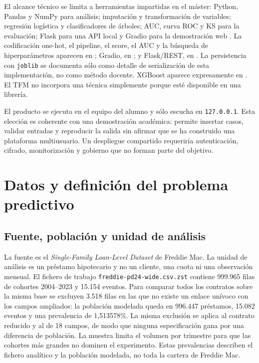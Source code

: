 \documentclass[10pt,a4paper]{article}
\newcommand{\DataFile}{\texttt{freddie-pd24-wide.csv.zst}}
\newcommand{\SourceLoans}{999.965}
\newcommand{\SourceEvents}{15.154}
\newcommand{\ModelLoans}{996.447}
\newcommand{\ModelEvents}{15.082}
\newcommand{\ModelEventRate}{1,513578\%}
\begin{document}
El alcance técnico se limita a herramientas impartidas en el máster: Python,
Pandas y NumPy para análisis; imputación y transformación de variables;
regresión logística y clasificadores de árboles; AUC, curva ROC y KS para la
evaluación; Flask para una API local y Gradio para la demostración web
\cite{data-prep,seleccion,logistica,clasificadores,scoring}. La codificación
one-hot, el pipeline, el score, el AUC y la búsqueda de hiperparámetros aparecen
en \cite[pp.~71, 73--74 y 76--81]{spark}; Gradio, en
\cite[p.~17]{ml-semanas}; y Flask/REST, en
\cite[pp.~98, 103--108 y 114]{productivizacion}. La persistencia con
\texttt{joblib} se documenta sólo como detalle de serialización de esta
implementación, no como método docente. XGBoost aparece expresamente en
\cite[p.~24]{ml-semanas}. El TFM no incorpora una técnica simplemente porque
esté disponible en una librería.

El producto se ejecuta en el equipo del alumno y sólo escucha en
\texttt{127.0.0.1}. Esta elección es coherente con una demostración académica:
permite insertar casos, validar entradas y reproducir la salida sin afirmar que
se ha construido una plataforma multiusuario. Un despliegue compartido requeriría
autenticación, cifrado, monitorización y gobierno que no forman parte del
objetivo.

\clearpage
\section{Datos y definición del problema predictivo}

\subsection{Fuente, población y unidad de análisis}

La fuente es el \emph{Single-Family Loan-Level Dataset} de Freddie Mac. La
unidad de análisis es un préstamo hipotecario y no un cliente, una cuota ni una
observación mensual. El fichero de trabajo \DataFile{} contiene
\SourceLoans{} filas de cohortes 2004--2023 y \SourceEvents{} eventos. Para
comparar todos los contratos sobre la misma base se excluyen 3.518 filas en las
que no existe un enlace unívoco con los campos ampliados: la población modelada
queda en \ModelLoans{} préstamos, \ModelEvents{} eventos y una prevalencia de
\ModelEventRate{}. La misma exclusión se aplica al contrato reducido y al de 18
campos, de modo que ninguna especificación gana por una diferencia de
población. La muestra limita el volumen por trimestre para que las cohortes más
grandes no dominen el experimento. Estas prevalencias describen el fichero
analítico y la población modelada, no toda la cartera de Freddie Mac.
\end{document}
